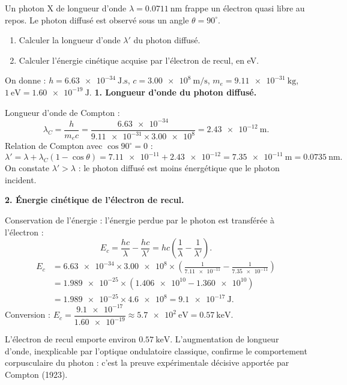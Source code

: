 \documentclass[11pt]{article}
\begin{document}
\begin{exoresolu}
Un photon X de longueur d'onde $\lambda = \num{0,0711}\ \text{nm}$ frappe un électron quasi libre au repos. Le photon diffusé est observé sous un angle $\theta = 90^{\circ}$.
\begin{enumerate}
\item Calculer la longueur d'onde $\lambda'$ du photon diffusé.
\item Calculer l'énergie cinétique acquise par l'électron de recul, en eV.
\end{enumerate}
On donne : $h = \num{6,63e-34}\ \text{J.s}$, $c = \num{3,00e8}\ \text{m/s}$, $m_e = \num{9,11e-31}\ \text{kg}$, $1\ \text{eV} = \num{1,60e-19}\ \text{J}$.
\tcblower
\textbf{1. Longueur d'onde du photon diffusé.}

Longueur d'onde de Compton :
\[ \lambda_C = \frac{h}{m_e c} = \frac{\num{6,63e-34}}{\num{9,11e-31} \times \num{3,00e8}} = \num{2,43e-12}\ \text{m}. \]
Relation de Compton avec $\cos 90^{\circ} = 0$ :
\[ \lambda' = \lambda + \lambda_C(1 - \cos\theta) = \num{7,11e-11} + \num{2,43e-12} = \num{7,35e-11}\ \text{m} = \num{0,0735}\ \text{nm}. \]
On constate $\lambda' > \lambda$ : le photon diffusé est moins énergétique que le photon incident.

\textbf{2. Énergie cinétique de l'électron de recul.}

Conservation de l'énergie : l'énergie perdue par le photon est transférée à l'électron :
\[ E_c = \frac{hc}{\lambda} - \frac{hc}{\lambda'} = hc\left(\frac{1}{\lambda} - \frac{1}{\lambda'}\right). \]
\begin{align*}
E_c &= \num{6,63e-34} \times \num{3,00e8} \times \left(\frac{1}{\num{7,11e-11}} - \frac{1}{\num{7,35e-11}}\right) \\
&= \num{1,989e-25} \times (\num{1,406e10} - \num{1,360e10}) \\
&= \num{1,989e-25} \times \num{4,6e8} = \num{9,1e-17}\ \text{J}.
\end{align*}
Conversion : $E_c = \dfrac{\num{9,1e-17}}{\num{1,60e-19}} \approx \num{5,7e2}\ \text{eV} = \num{0,57}\ \text{keV}$.

L'électron de recul emporte environ $\num{0,57}\ \text{keV}$. L'augmentation de longueur d'onde, inexplicable par l'optique ondulatoire classique, confirme le comportement corpusculaire du photon : c'est la preuve expérimentale décisive apportée par Compton (1923).
\end{exoresolu}
\end{document}
